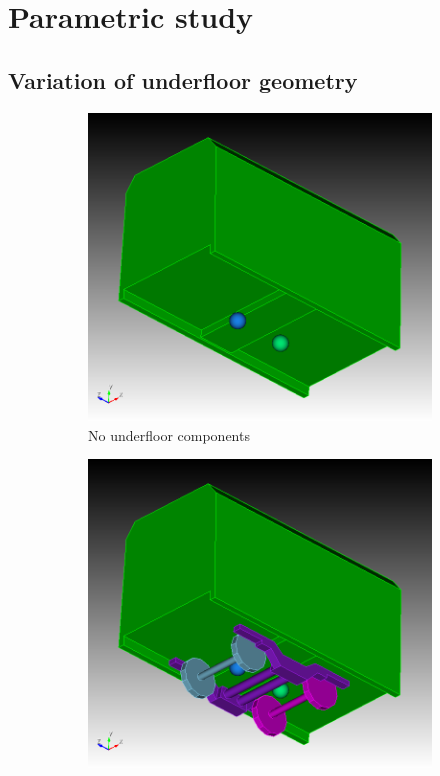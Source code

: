 
\section{Parametric study}
\label{section:parametric_study}
\subsection{Variation of underfloor geometry}

\begin{figure}[H]
	\centering
	\begin{subfigure}[b]{0.49\textwidth}
		\centering
		\includegraphics[width = 0.8\linewidth]{fig/chap4/geometry/no_underfloor_components_2.png}
		\caption{No underfloor components}
	\end{subfigure}
	\begin{subfigure}[b]{0.49\textwidth}
		\centering
		\includegraphics[width = 0.8\linewidth]{fig/chap4/geometry/no_air_suspension_2.png}

\end{subfigure}
\end{figure}
